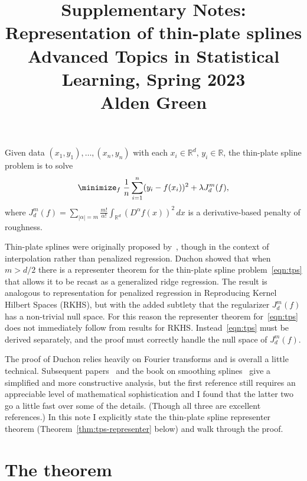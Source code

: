 \documentclass{article}
\title{Supplementary Notes: Representation of thin-plate splines \\ \smallskip
\large Advanced Topics in Statistical Learning, Spring 2023 \\ \smallskip
Alden Green}
\author{}
\date{}
\newcommand{\Reals}{\mathbb{R}} %
\newcommand{\Rd}{\Reals^d}
\newcommand{\1}{\mathbf{1}}
\begin{document}
\maketitle
\RaggedRight
\vspace{-50pt}

Given data $(x_1,y_1),\ldots,(x_n,y_n)$ with each $x_i \in \Reals^{d}$, $y_i \in \Reals$, the thin-plate spline problem is to solve
\begin{equation}
\label{eqn:tps}
\minimize_f \; \frac{1}{n}\sum_{i = 1}^{n}(y_i - f(x_i))^2 + \lambda J_d^{m}(f),
\end{equation}
where $J_d^{m}(f) = \sum_{|\alpha| = m} \frac{m!}{\alpha!} \int_{\Rd} (D^{\alpha}f(x))^2 \,dx$ is a derivative-based penalty of roughness.

Thin-plate splines were originally proposed by~\citet{duchon1977splines}, though in the context of interpolation rather than penalized regression. Duchon showed that when $m > d/2$ there is a representer theorem for the thin-plate spline problem~\eqref{eqn:tps} that allows it to be recast as a generalized ridge regression. The result is analogous to representation for penalized regression in Reproducing Kernel Hilbert Spaces (RKHS), but with the added subtlety that the regularizer $J_d^m(f)$ has a non-trivial null space. For this reason the representer theorem for~\eqref{eqn:tps} does not immediately follow from results for RKHS. Instead~\eqref{eqn:tps} must be derived separately, and the proof must correctly handle the null space of $J_d^m(f)$.

The proof of Duchon relies heavily on Fourier transforms and is overall a little technical. Subsequent papers~\citet{meinguet1979multivariate,wahba1980some} and the book on smoothing splines~\citet{gu2013smoothing} give a simplified and more constructive analysis, but the first reference still requires an appreciable level of mathematical sophistication and I found that the latter two go a little fast over some of the details. (Though all three are excellent references.) In this note I explicitly state the thin-plate spline representer theorem (Theorem~\ref{thm:tps-representer} below) and walk through the proof.

\section{The theorem}
\end{document}
